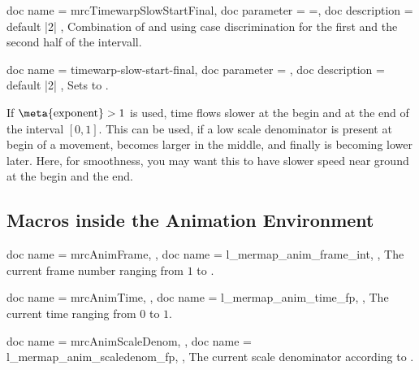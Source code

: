 \begin{docCommands}[
    doc new     = 2023-07-31,
  ]{
    {
      doc name        = mrcTimewarpSlowStartFinal,
      doc parameter   = {=},
      doc description = {default |2|}
    },
  }
  Combination of  and 
  using case discrimination for the first and the second half of the intervall.
\end{docCommands}


\begin{docMrcKeys}[
    doc keypath = anim,
    doc new     = 2023-07-31,
  ]{
    {
      doc name        = timewarp-slow-start-final,
      doc parameter   = ,
      doc description = {default |2|}
    },
  }
  Sets  to .
  \par
  If $\text{\meta{exponent}}>1$ is used, time flows slower at the begin and at the end of the
  interval \mbox{$[0,1]$}. This can be used, if a low scale denominator is
  present at begin of a movement, becomes larger in the middle, and finally
  is becoming lower later. Here, for smoothness,
  you may want this to have slower speed near ground at the begin and the end.
\end{docMrcKeys}


\clearpage
\subsection{Macros inside the Animation Environment}\label{ref:animMacros}

\begin{docCommands}[
    doc new     = 2023-07-31,
  ]{
    {
      doc name        = mrcAnimFrame,
    },
    {
      doc name        = l_mermap_anim_frame_int,
    },
  }
  The current frame number ranging from $1$ to .
\end{docCommands}


\begin{docCommands}[
    doc new     = 2023-07-31,
  ]{
    {
      doc name        = mrcAnimTime,
    },
    {
      doc name        = l_mermap_anim_time_fp,
    },
  }
  The current time ranging from $0$ to $1$.
\end{docCommands}


\begin{docCommands}[
    doc new     = 2023-07-31,
  ]{
    {
      doc name        = mrcAnimScaleDenom,
    },
    {
      doc name        = l_mermap_anim_scaledenom_fp,
    },
  }
  The current scale denominator according to .
\end{docCommands}


